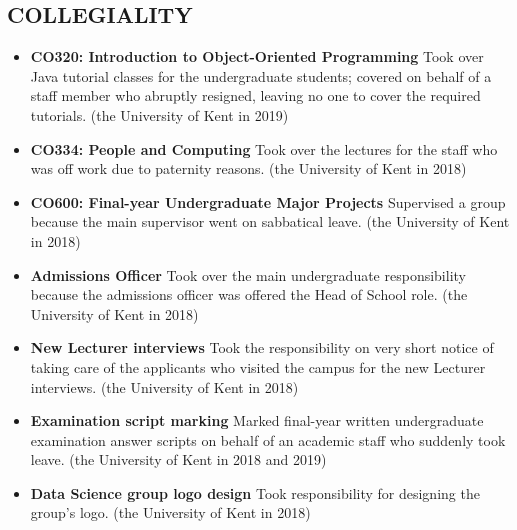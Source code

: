 \documentclass[margin]{res}
\begin{document}
\begin{resume}
\section{COLLEGIALITY}
\begin{itemize}
    \item \textbf{CO320: Introduction to Object-Oriented Programming} Took over Java tutorial classes for the undergraduate students; covered on behalf of a staff member who abruptly resigned, leaving no one to cover the required tutorials. (the University of Kent in 2019)
    \item \textbf{CO334: People and Computing} Took over the lectures for the staff who was off work due to paternity reasons. (the University of Kent in 2018)
    \item \textbf{CO600: Final-year Undergraduate Major Projects} Supervised a group because the main supervisor went on sabbatical leave. (the University of Kent in 2018)
    \item \textbf{Admissions Officer} Took over the main undergraduate responsibility because the admissions officer was offered the Head of School role. (the University of Kent in 2018)
    \item \textbf{New Lecturer interviews} Took the responsibility on very short notice of taking care of the applicants who visited the campus for the new Lecturer interviews. (the University of Kent in 2018)
    \item \textbf{Examination script marking} Marked final-year written undergraduate examination answer scripts on behalf of an academic staff who suddenly took leave. (the University of Kent in 2018 and 2019)
    \item \textbf{Data Science group logo design} Took responsibility for designing the group's logo. (the University of Kent in 2018)
\end{itemize}


\end{resume}
\end{document}
